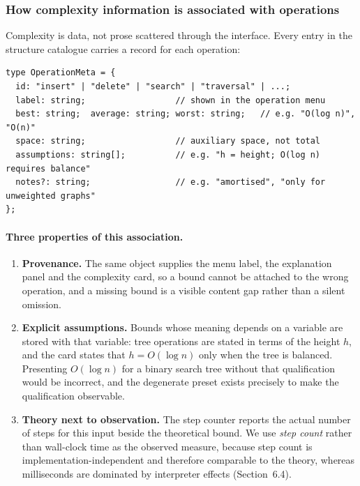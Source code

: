 \documentclass[11pt,a4paper]{article}
\begin{document}
\subsubsection{How complexity information is associated with operations}

Complexity is data, not prose scattered through the interface. Every entry in the structure
catalogue carries a record for each operation:

\begin{lstlisting}[style=ts,caption={Complexity is attached to the catalogue entry that also
drives the operation menu, so the displayed bound cannot disagree with the implemented
operation.},label={lst:complexity}]
type OperationMeta = {
  id: "insert" | "delete" | "search" | "traversal" | ...;
  label: string;                  // shown in the operation menu
  best: string;  average: string; worst: string;   // e.g. "O(log n)", "O(n)"
  space: string;                  // auxiliary space, not total
  assumptions: string[];          // e.g. "h = height; O(log n) requires balance"
  notes?: string;                 // e.g. "amortised", "only for unweighted graphs"
};
\end{lstlisting}

\paragraph{Three properties of this association.}
\begin{enumerate}[leftmargin=1.6em,itemsep=2pt]
  \item \textbf{Provenance.} The same object supplies the menu label, the explanation panel
        and the complexity card, so a bound cannot be attached to the wrong operation, and a
        missing bound is a visible content gap rather than a silent omission.
  \item \textbf{Explicit assumptions.} Bounds whose meaning depends on a variable are stored
        with that variable: tree operations are stated in terms of the height $h$, and the
        card states that $h = O(\log n)$ only when the tree is balanced. Presenting
        $O(\log n)$ for a binary search tree without that qualification would be incorrect,
        and the degenerate preset exists precisely to make the qualification observable.
  \item \textbf{Theory next to observation.} The step counter reports the actual number of
        steps for this input beside the theoretical bound. We use \emph{step count} rather
        than wall-clock time as the observed measure, because step count is
        implementation-independent and therefore comparable to the theory, whereas
        milliseconds are dominated by interpreter effects (Section~6.4).
\end{enumerate}
\end{document}
